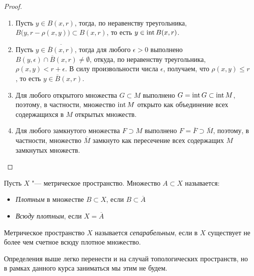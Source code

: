 \pagebreak

\begin{proof}~
	\begin{enumerate}
		\item Пусть $y \in B(x, r)$, тогда, по неравенству треугольника, $B\big(y, r - \rho(x, y)\big) \subset B(x, r)$, то есть $y \in \operatorname{int} B(x, r)$.
		
		\item Пусть $y \in \overline{\overline B(x, r)}$, тогда для любого $\epsilon > 0$ выполнено $B(y, \epsilon) \cap \overline B(x, r) \ne \emptyset$, откуда, по неравенству треугольника, $\rho(x, y) < r + \epsilon$. В силу произвольности числа $\epsilon$, получаем, что $\rho(x, y) \le r$, то есть $y \in \overline B(x, r)$.
		
		\item Для любого открытого множества $G \subset M$ выполнено $G = \operatorname{int} G \subset \operatorname{int} M$, поэтому, в частности, множество $\operatorname{int} M$ открыто как объединение всех содержащихся в $M$ открытых множеств.
  
		\item Для любого замкнутого множества $F \supset M$ выполнено $F = \overline F \supset \overline M$, поэтому, в частности, множество $\overline M$ замкнуто как пересечение всех содержащих $M$ замкнутых множеств.\qedhere
	\end{enumerate}
\end{proof}

\begin{definition}
	Пусть $X$ "--- метрическое пространство. Множество $A \subset X$ называется:
	\begin{itemize}
		\item \textit{Плотным} в множестве $B \subset X$, если $B \subset \overline {A}$
 
		\item \textit{Всюду плотным}, если $X = \overline {A}$
	\end{itemize}
\end{definition}

\begin{definition}
	Метрическое пространство $X$ называется \textit{сепарабельным}, если в $X$ существует не более чем счетное всюду плотное множество.
\end{definition}

\begin{note}
	Определения выше легко перенести и на случай топологических пространств, но в рамках данного курса заниматься мы этим не будем.
\end{note}

